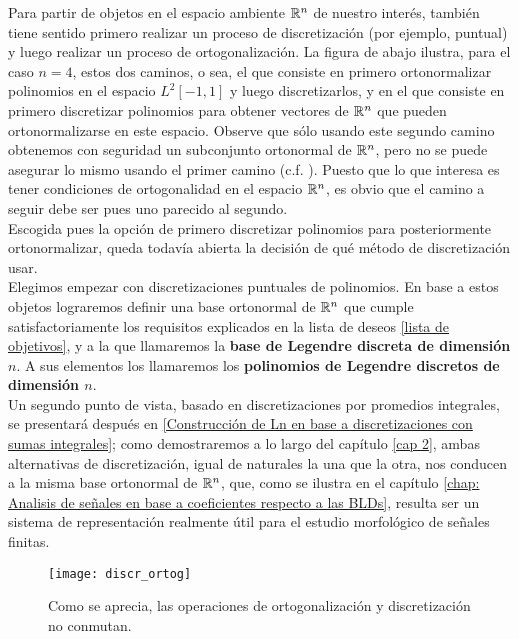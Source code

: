 Para partir de
objetos en el espacio ambiente
$\mathbb{R}^{n}$ de nuestro interés,
también tiene sentido primero realizar
un proceso de discretización (por ejemplo, 
puntual) y luego realizar
un proceso de ortogonalización. La figura
de abajo
ilustra, para el caso $n=4$, estos dos caminos,
o sea, el que consiste en primero ortonormalizar
polinomios en el espacio $L^{2}[-1,1]$ y luego discretizarlos,
y en el que consiste en primero discretizar polinomios
para obtener vectores de $\mathbb{R}^{n}$ que pueden ortonormalizarse
en este espacio. Observe que sólo usando este segundo camino 
obtenemos con seguridad un subconjunto ortonormal de $\mathbb{R}^{n}$,
pero no se puede asegurar lo mismo usando el primer camino
(c.f. \cite{stockel}).
Puesto que lo
que interesa es tener condiciones de ortogonalidad
en el espacio $\mathbb{R}^{n}$, es obvio que 
el camino a seguir debe ser pues uno parecido al segundo. \\


Escogida pues la opción de primero 
discretizar polinomios para posteriormente
ortonormalizar, queda todavía abierta
la decisión de qué método de discretización usar. \\

Elegimos empezar
con discretizaciones puntuales de polinomios.
En base a estos objetos lograremos definir
una base ortonormal de $\mathbb{R}^{n}$ que cumple satisfactoriamente
los requisitos explicados en la lista de deseos
\ref{lista de objetivos}, y a la que llamaremos
la \textbf{base de Legendre discreta de dimensión $n$}. 
A sus elementos los llamaremos los \textbf{polinomios de Legendre
discretos de dimensión $n$}.\\

Un segundo punto de vista, basado
en discretizaciones por promedios integrales,
se presentará después en
\ref{Construcción de Ln en base a discretizaciones con sumas integrales}; 
como demostraremos a lo largo del capítulo \ref{cap 2}, 
ambas alternativas
de discretización, igual de naturales la una que la otra, nos
conducen a la misma base ortonormal de $\mathbb{R}^{n}$,
que, como se ilustra en el capítulo 
\ref{chap: Analisis de señales en base a coeficientes respecto a las BLDs},
resulta ser un sistema de representación
realmente útil para el estudio morfológico de señales finitas.


\begin{figure}[H]
\centering\captionsetup{format = hang}
	\begin{measuredfigure}
		\label{fig: ortogonalizacion, discretizacion}
		\texttt{[image: discr\_ortog]} 
		\caption{Como se aprecia, las operaciones de
		ortogonalización y discretización no conmutan.}
 	\end{measuredfigure}
 \end{figure}


